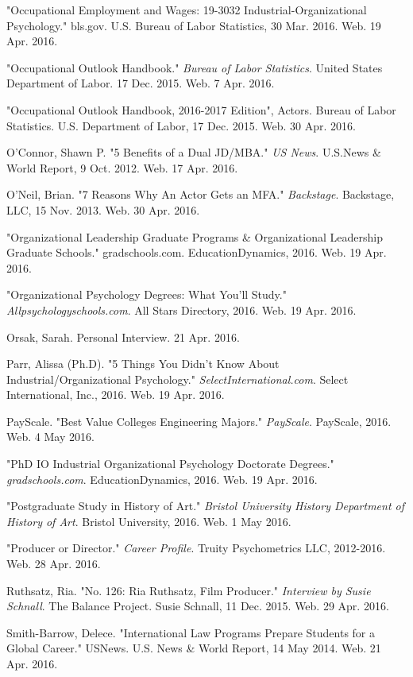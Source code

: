 \begin{workscited}
\begin{flushleft}
\bibent
"Occupational Employment and Wages: 19-3032 Industrial-Organizational Psychology."			bls.gov. U.S. Bureau of Labor Statistics, 30 Mar. 2016. Web. 19 Apr. 2016. 

\bibent
"Occupational Outlook Handbook." \textit{Bureau of Labor Statistics}. United States Department of 	
Labor. 17 Dec. 2015. Web. 7 Apr. 2016.

\bibent
"Occupational Outlook Handbook, 2016-2017 Edition", Actors. Bureau of Labor Statistics. U.S. 
Department of Labor, 17 Dec. 2015. Web. 30 Apr. 2016. 

\bibent
O'Connor, Shawn P. "5 Benefits of a Dual JD/MBA." \textit{US News}. U.S.News \& World Report, 9 
Oct. 2012. Web. 17 Apr. 2016.

\bibent
O’Neil, Brian. "7 Reasons Why An Actor Gets an MFA." \textit{Backstage}. Backstage, LLC, 15 Nov. 
2013. Web. 30 Apr. 2016. 

\bibent
"Organizational Leadership Graduate Programs \& Organizational Leadership Graduate Schools."	
gradschools.com. EducationDynamics, 2016. Web. 19 Apr. 2016. 

\bibent
"Organizational Psychology Degrees: What You’ll Study." \textit{Allpsychologyschools.com}.	 		All Stars Directory, 2016. Web. 19 Apr. 2016.

\bibent
Orsak, Sarah. Personal Interview. 21 Apr. 2016.

\bibent
Parr, Alissa (Ph.D). "5 Things You Didn’t Know About Industrial/Organizational Psychology." \textit{		SelectInternational.com}. Select International, Inc., 2016. Web. 19 Apr. 2016.

\bibent
PayScale. "Best Value Colleges Engineering Majors." \textit{PayScale}. PayScale, 2016. Web. 4 May 2016.

\bibent
"PhD IO Industrial Organizational Psychology Doctorate Degrees." \textit{gradschools.com}. 			EducationDynamics, 2016. Web. 19 Apr. 2016.

\bibent
"Postgraduate Study in History of Art." \textit{Bristol University History Department of History of Art}. 
Bristol University, 2016. Web. 1 May 2016.

\bibent
"Producer or Director." \textit{Career Profile}. Truity Psychometrics LLC, 2012-2016. Web. 28 Apr. 
2016.

\bibent
Ruthsatz, Ria. "No. 126: Ria Ruthsatz, Film Producer." \textit{Interview by Susie Schnall}. The Balance 
Project. Susie Schnall, 11 Dec. 2015. Web. 29 Apr. 2016.

\bibent
Smith-Barrow, Delece. "International Law Programs Prepare Students for a Global Career." 
USNews. U.S. News \& World Report, 14 May 2014. Web. 21 Apr. 2016. 


\end{flushleft}
\end{workscited}
